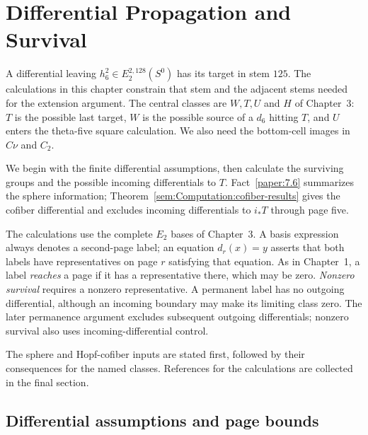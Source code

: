 \chapter{Differential Propagation and Survival}
A differential leaving $h_6^2\in E_2^{2,128}(S^0)$ has its target in
stem $125$. The calculations in this chapter constrain that stem and the
adjacent stems needed for the extension argument. The central classes
are $W,T,U$ and $H$ of Chapter~3: $T$ is the possible last target,
$W$ is the possible source of a $d_6$ hitting $T$, and $U$ enters the
theta-five square calculation. We also need the bottom-cell images
in $C\nu$ and $C_2$.

We begin with the finite differential assumptions, then calculate the
surviving groups and the possible incoming differentials to $T$.
Fact~\ref{paper:7.6} summarizes the sphere information;
Theorem~\ref{sem:Computation:cofiber-results} gives the cofiber
differential and excludes incoming differentials to $i_*T$ through
page five.

The calculations use the complete $E_2$ bases of Chapter~3. A basis
expression always denotes a second-page label; an equation $d_r(x)=y$
asserts that both labels have representatives on page $r$ satisfying
that equation.
As in Chapter~1, a label \emph{reaches} a page if it has a
representative there, which may be zero. \emph{Nonzero survival}
requires a nonzero representative. A permanent label has no outgoing
differential, although an incoming boundary may make its limiting class
zero. The later permanence argument excludes subsequent outgoing differentials;
nonzero survival also uses incoming-differential control.

The sphere and Hopf-cofiber inputs are stated first, followed by their
consequences for the named classes. References for the calculations
are collected in the final section.

\section{Differential assumptions and page bounds}



